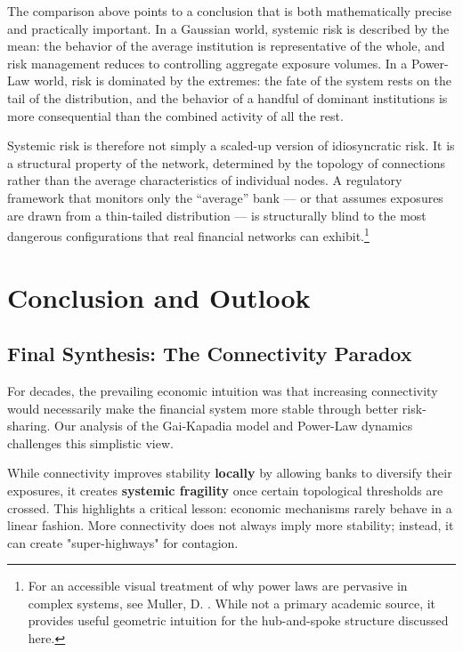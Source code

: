 \documentclass[a4paper,12pt,twoside]{article}
\begin{document}
The comparison above points to a conclusion that is both 
mathematically precise and practically important. In a Gaussian world, 
systemic risk is described by the mean: the behavior of the average 
institution is representative of the whole, and risk management 
reduces to controlling aggregate exposure volumes. In a Power-Law 
world, risk is dominated by the extremes: the fate of the system rests 
on the tail of the distribution, and the behavior of a handful of 
dominant institutions is more consequential than the combined activity 
of all the rest.

Systemic risk is therefore not simply a scaled-up version of 
idiosyncratic risk. It is a structural property of the network, 
determined by the topology of connections rather than the average 
characteristics of individual nodes. A regulatory framework that 
monitors only the ``average'' bank — or that assumes exposures are 
drawn from a thin-tailed distribution — is structurally blind to the 
most dangerous configurations that real financial networks can 
exhibit.\footnote{For an accessible visual treatment of why power laws 
are pervasive in complex systems, see Muller, D. \cite{veritasium2024}. While not a primary academic 
source, it provides useful geometric intuition for the hub-and-spoke 
structure discussed here.}

\newpage
\section{Conclusion and Outlook}
\label{sec:conclusion}
\subsection{Final Synthesis: The Connectivity Paradox}
For decades, the prevailing economic intuition was that increasing connectivity would necessarily make the financial system more stable through better risk-sharing. Our analysis of the Gai-Kapadia model and Power-Law dynamics challenges this simplistic view. 

While connectivity improves stability \textbf{locally} by allowing banks to diversify their exposures, it creates \textbf{systemic fragility} once certain topological thresholds are crossed. This highlights a critical lesson: economic mechanisms rarely behave in a linear fashion. More connectivity does not always imply more stability; instead, it can create "super-highways" for contagion.
\end{document}
